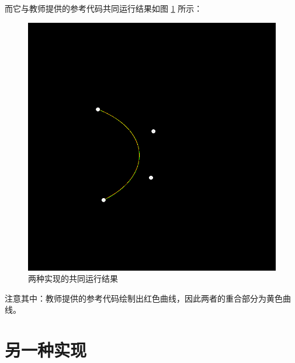 \documentclass{ctexbeamer}
\begin{document}
    \begin{frame}
        
        而它与教师提供的参考代码共同运行结果如图 \ref{fig:res-2} 所示：

        \begin{figure}
            \centering
            \includegraphics[height=0.6\textheight]{pics/bezier_curve_2.png}
            \caption{两种实现的共同运行结果}
            \label{fig:res-2}
        \end{figure}

        注意其中：教师提供的参考代码绘制出红色曲线，因此两者的重合部分为黄色曲线。

    \end{frame}

    \section{另一种实现}
\end{document}
